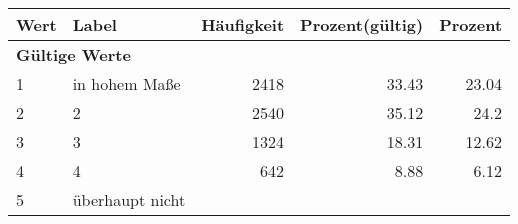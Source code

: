      \begin{longtable}{lXrrr}
     \toprule
     \textbf{Wert} & \textbf{Label} & \textbf{Häufigkeit} & \textbf{Prozent(gültig)} & \textbf{Prozent} \\
     \endhead
     \midrule
     \multicolumn{5}{l}{\textbf{Gültige Werte}}\\

     1 &
     \multicolumn{1}{X}{ in hohem Maße   } &


       \num{2418} &
       \num[round-mode=places,round-precision=2]{33.43} &
         \num[round-mode=places,round-precision=2]{23.04} \\

     2 &
     \multicolumn{1}{X}{ 2   } &


       \num{2540} &
       \num[round-mode=places,round-precision=2]{35.12} &
         \num[round-mode=places,round-precision=2]{24.2} \\

     3 &
     \multicolumn{1}{X}{ 3   } &


       \num{1324} &
       \num[round-mode=places,round-precision=2]{18.31} &
         \num[round-mode=places,round-precision=2]{12.62} \\

     4 &
     \multicolumn{1}{X}{ 4   } &


       \num{642} &
       \num[round-mode=places,round-precision=2]{8.88} &
         \num[round-mode=places,round-precision=2]{6.12} \\

     5 &
     \multicolumn{1}{X}{ überhaupt nicht   } &



\end{longtable}
